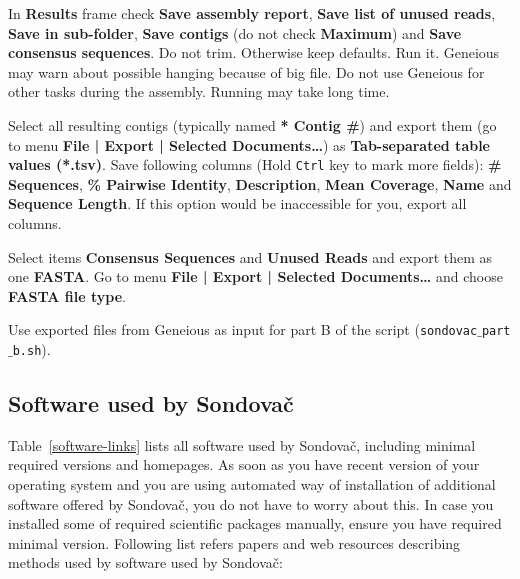\documentclass[a4paper, 11pt, twoside]{article}
\begin{document}
In \textbf{Results} frame check \textbf{Save assembly report}, \textbf{Save list of unused reads}, \textbf{Save in sub-folder}, \textbf{Save contigs} (do not check \textbf{Maximum}) and \textbf{Save consensus sequences}. Do not trim. Otherwise keep defaults. Run it. Geneious may warn about possible hanging because of big file. Do not use Geneious for other tasks during the assembly. Running may take long time.

Select all resulting contigs (typically named \textbf{* Contig \#}) and export them (go to menu \textbf{File | Export | Selected Documents\ldots}) as \textbf{Tab-separated table values (*.tsv)}. Save following columns (Hold \texttt{Ctrl} key to mark more fields): \textbf{\# Sequences}, \textbf{\% Pairwise Identity}, \textbf{Description}, \textbf{Mean Coverage}, \textbf{Name} and \textbf{Sequence Length}. If this option would be inaccessible for you, export all columns.

Select items \textbf{Consensus Sequences} and \textbf{Unused Reads} and export them as one \textbf{FASTA}. Go to menu \textbf{File | Export | Selected Documents\ldots} and choose \textbf{FASTA file type}.

Use exported files from Geneious as input for part B of the script (\texttt{sondovac$\_$part$\_$b.sh}).

\subsection{Software used by Sondovač}

Table~\ref{software-links} lists all software used by Sondovač, including minimal required versions and homepages. As soon as you have recent version of your operating system and you are using automated way of installation of additional software offered by Sondovač, you do not have to worry about this. In case you installed some of required scientific packages manually, ensure you have required minimal version. Following list refers papers and web resources describing methods used by software used by Sondovač:
\end{document}
